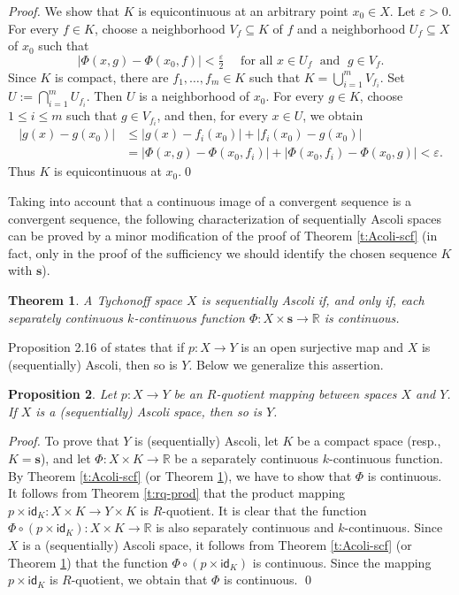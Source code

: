 \documentclass[preprint,11pt]{elsarticle}
\newtheorem{theorem}{Theorem}[section]
\newtheorem{proposition}[theorem]{Proposition}
\numberwithin{equation}{section}
\numberwithin{theorem}{section}
\newcommand{\e}{\varepsilon}
\newcommand{\IR}{\mathbb{R}}
\newcommand{\Id}{\mathsf{id}}
\begin{document}
\begin{proof}
We show that $K$ is equicontinuous at an arbitrary point $x_0\in X$. Let $\e>0$. For every $f\in K$, choose a neighborhood $V_f\subseteq K$ of $f$ and a neighborhood $U_f\subseteq X$ of $x_0$ such that
\[
|\Phi(x,g)-\Phi(x_0,f)|<\tfrac{\e}{2} \quad \mbox{ for all } x\in U_f \; \mbox{ and }\; g\in V_f.
\]
Since $K$ is compact, there are $f_1,\dots,f_m\in K$ such that $K=\bigcup_{i=1}^m V_{f_i}$. Set $U:= \bigcap_{i=1}^m U_{f_i}$. Then $U$ is a neighborhood of $x_0$. For every $g\in K$, choose $1\leq i\leq m$ such that $g\in V_{f_i}$, and then, for every $x\in U$,  we obtain
\[
\begin{aligned}
|g(x)-g(x_0)| & \leq |g(x)-f_i(x_0)|+|f_i(x_0)-g(x_0)|\\
& =|\Phi(x,g)-\Phi(x_0,f_i)| + |\Phi(x_0,f_i)-\Phi(x_0,g)|<\e.
\end{aligned}
\]
Thus $K$ is equicontinuous at $x_0$.\qed
\end{proof}





Taking into account that a continuous image of a convergent sequence is a convergent sequence, the following characterization of sequentially Ascoli spaces can be proved by a minor modification of the proof of Theorem \ref{t:Acoli-scf} (in fact, only in the proof of the sufficiency we should identify the chosen sequence $K$ with $\mathbf{s}$).

\begin{theorem} \label{t:seq-Acoli-scf}
A Tychonoff space $X$ is sequentially Ascoli if, and only if, each separately continuous $k$-continuous function $\Phi:X\times \mathbf{s}\to \IR$ is continuous.
\end{theorem}

Proposition 2.16 of \cite{Gabr-seq-Ascoli} states that if $p:X\to Y$ is an open surjective map and $X$ is (sequentially) Ascoli, then so is $Y$. Below we generalize this assertion.


\begin{proposition} \label{p:Ascoli-R-quotient}
Let $p:X\to Y$ be an $R$-quotient mapping  between  spaces $X$ and $Y$. If $X$ is a (sequentially) Ascoli space, then so is $Y$.
\end{proposition}

\begin{proof}
To prove that $Y$ is (sequentially) Ascoli, let $K$ be a compact space (resp., $K=\mathbf{s}$), and let $\Phi:X\times K\to\IR$ be a separately continuous $k$-continuous function. By Theorem \ref{t:Acoli-scf} (or Theorem \ref{t:seq-Acoli-scf}), we have to show that $\Phi$ is continuous. It follows from Theorem \ref{t:rq-prod} that the product mapping $p\times\Id_K:X\times K\to Y\times K$ is $R$-quotient. It is clear that the function $\Phi\circ (p\times\Id_K):X\times K\to\IR$ is also separately continuous and $k$-continuous. Since $X$ is a (sequentially) Ascoli space, it follows from Theorem \ref{t:Acoli-scf} (or Theorem \ref{t:seq-Acoli-scf}) that the function $\Phi\circ (p\times\Id_K)$ is continuous. Since the mapping $p\times\Id_K$ is $R$-quotient, we obtain that $\Phi$ is continuous. \qed
\end{proof}
\end{document}
